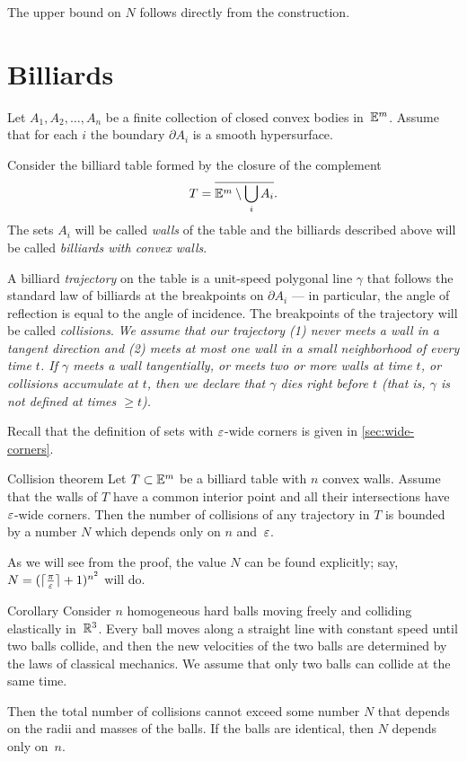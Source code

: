 The upper bound on $N$ follows directly from the construction.
\qeds

\section{Billiards}

Let $A_1,A_2,\ldots, A_n$ be a finite collection of closed convex bodies in~$\mathbb{E}^m$.
Assume that for each $i$
the boundary $\partial A_i$ is a smooth hypersurface.

Consider the billiard table formed by the closure of the complement 
$$T=\overline{\mathbb{E}^m\setminus \bigcup_{i} A_i}.$$
The sets $A_i$ will be called {}\emph{walls} of the table
and the billiards described above will be called {}\emph{billiards with convex walls}.

A billiard {}\emph{trajectory} on the table is a unit-speed polygonal line $\gamma$ that follows the standard law of billiards at the breakpoints on $\partial A_i$
--- in particular, the angle of reflection is equal to the angle of incidence.
The breakpoints of the trajectory will be called {}\emph{collisions}.
\textit{We assume that our trajectory (1) never meets a wall in a tangent direction and (2) meets at most one wall in a small neighborhood of every time $t$.
If $\gamma$ meets a wall tangentially,
or meets two or more walls at time $t$,
or collisions accumulate at $t$,
then we declare that $\gamma$ dies right before $t$ (that is, $\gamma$ is not defined at times  $\ge t$).}

Recall that the definition of sets with $\varepsilon$-wide corners is given in \ref{sec:wide-corners}.

\begin{thm}{Collision theorem}\label{thm:collision}
Let $T\subset\mathbb{E}^m$ be a billiard table with $n$ convex walls.
Assume that the walls of $T$ have a common interior point  and all their intersections have $\varepsilon$-wide corners.
Then the number of collisions of any trajectory in  $T$  is bounded
by a number $N$ which depends only on $n$ and~$\varepsilon$.
\end{thm}

As we will see from the proof, the value $N$ can be found explicitly;
say, $N=(\lceil\tfrac\pi{\varepsilon}\rceil+1)^{n^2}$ will do.

\begin{thm}{Corollary}\label{cor:balls}
Consider $n$ homogeneous hard balls
moving freely and colliding
elastically in~$\mathbb{R}^3$. 
Every ball moves
along a straight line with constant speed until two balls collide, and then
the new velocities of the two balls are determined by the
laws of classical mechanics. 
We assume that only two balls can collide at the same time.

Then the total number of collisions cannot exceed some number $N$ that  depends on the radii and masses of the balls.
If the balls are identical, then $N$ depends only on~$n$.
\end{thm}


